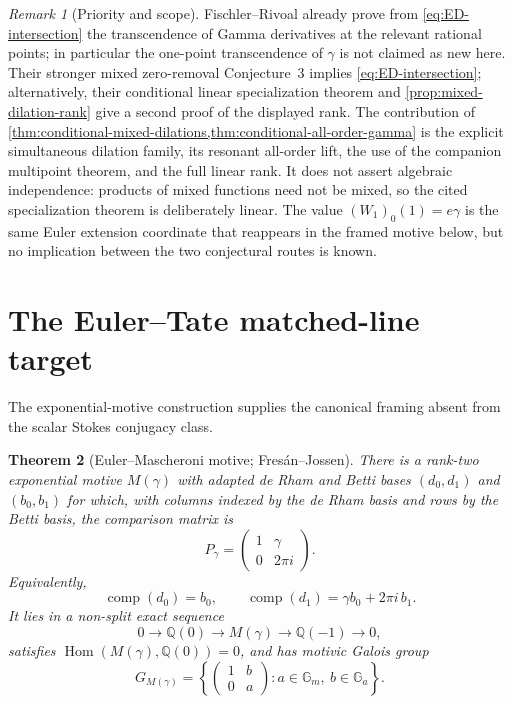 \documentclass[11pt]{article}
\theoremstyle{keio}
\newtheorem{theorem}{Theorem}[section]
\theoremstyle{definition}
\theoremstyle{remark}
\newtheorem{remark}[theorem]{Remark}
\newcommand{\Q}{\mathbb Q}
\begin{document}
\begin{remark}[Priority and scope]
Fischler--Rivoal already prove from \eqref{eq:ED-intersection} the
transcendence of Gamma derivatives at the relevant rational points; in
particular the one-point transcendence of \(\gamma\) is not claimed as new
here.  Their stronger mixed zero-removal Conjecture~3 implies
\eqref{eq:ED-intersection}; alternatively, their conditional linear
specialization theorem and \cref{prop:mixed-dilation-rank} give a second
proof of the displayed rank.  The contribution of
\cref{thm:conditional-mixed-dilations,thm:conditional-all-order-gamma} is
the explicit simultaneous dilation family, its resonant all-order lift, the
use of the companion multipoint theorem, and the full linear rank.  It
does not assert algebraic independence: products of mixed functions need
not be mixed, so the cited specialization theorem is deliberately linear.
The value \((W_1)_0(1)=e\gamma\) is the same Euler extension coordinate
that reappears in the framed motive below, but no implication between the
two conjectural routes is known.
\end{remark}

\section{The Euler--Tate matched-line target}
\label{sec:euler-tate}

The exponential-motive construction supplies the canonical framing absent
from the scalar Stokes conjugacy class.

\begin{theorem}[Euler--Mascheroni motive; Fres\'an--Jossen]
\label{thm:FJ-euler-motive}
There is a rank-two exponential motive \(M(\gamma)\) with adapted de Rham
and Betti bases \((d_0,d_1)\) and \((b_0,b_1)\) for which, with columns
indexed by the de Rham basis and rows by the Betti basis, the comparison
matrix is
\begin{equation}\label{eq:euler-period-matrix}
 P_\gamma=\begin{pmatrix}1&\gamma\\0&2\pi i\end{pmatrix}.
\end{equation}
Equivalently,
\[
 \operatorname{comp}(d_0)=b_0,
 \qquad
 \operatorname{comp}(d_1)=\gamma b_0+2\pi i\,b_1.
\]
It lies in a non-split exact sequence
\begin{equation}\label{eq:euler-motive-extension}
 0\longrightarrow\Q(0)\longrightarrow M(\gamma)
 \longrightarrow\Q(-1)\longrightarrow0,
\end{equation}
satisfies \(\operatorname{Hom}(M(\gamma),\Q(0))=0\), and has motivic
Galois group
\[
 G_{M(\gamma)}=
 \left\{\begin{pmatrix}1&b\\0&a\end{pmatrix}:
 a\in\mathbb G_m,\ b\in\mathbb G_a\right\}.
\]
\end{theorem}
\end{document}
